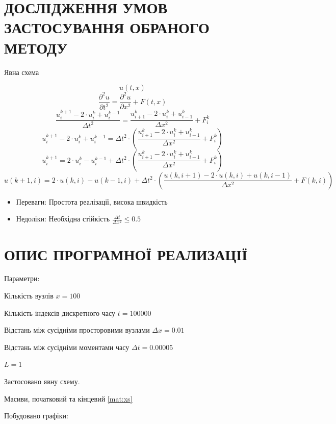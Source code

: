 \documentclass{article}
\begin{document}
    \newpage
    \section{ДОСЛІДЖЕННЯ УМОВ ЗАСТОСУВАННЯ ОБРАНОГО МЕТОДУ}
        Явна схема

        $$ u(t, x) $$
        $$ \frac{\partial^2{u}}{\partial{t^2}} = \frac{\partial^2{u}}{\partial{x^2}} + F(t, x) $$
        $$ \frac{u_i^{k+1} - 2 \cdot u_i^{k} + u_i^{k-1}}{\Delta{t}^2} = \frac{u_{i+1}^{k} - 2 \cdot u_i^{k} + u_{i-1}^{k}}{\Delta{x}^2} + F_i^{k} $$
        $$ u_i^{k+1} - 2 \cdot u_i^{k} + u_i^{k-1} = \Delta{t}^2 \cdot \left( \frac{u_{i+1}^{k} - 2 \cdot u_i^{k} + u_{i-1}^{k}}{\Delta{x}^2} + F_i^{k} \right) $$
        $$ u_i^{k+1} = 2 \cdot u_i^{k} - u_i^{k-1} + \Delta{t}^2 \cdot \left( \frac{u_{i+1}^{k} - 2 \cdot u_i^{k} + u_{i-1}^{k}}{\Delta{x}^2} + F_i^{k} \right) $$
        $$ u(k+1, i) = 2 \cdot u(k, i) - u(k-1, i) + \Delta{t}^2 \cdot \left( \frac{u(k, i+1) - 2 \cdot u(k, i) + u(k, i-1)}{\Delta{x}^2} + F(k, i) \right) $$

        \begin{itemize}
            \item Переваги: Простота реалізації, висока швидкість
            \item Недоліки: Необхідна стійкість $ \frac{\Delta{t}}{\Delta{x}^2} \leq 0.5 $
        \end{itemize}

    \newpage
    \section{ОПИС ПРОГРАМНОЇ РЕАЛИЗАЦІЇ}
        Параметри:

        Кількість вузлів $ x = 100 $
        
        Кількість індексів дискретного часу $ t = 100 000 $
        
        Відстань між сусідніми просторовими вузлами $ \Delta{x} = 0.01 $
        
        Відстань між сусідніми моментами часу $ \Delta{t} = 0.00005 $

        $ L = 1 $

        Застосовано явну схему.

        Масиви, початковий та кінцевий \eqref{mat:xs}

        Побудовано графіки:
\end{document}
